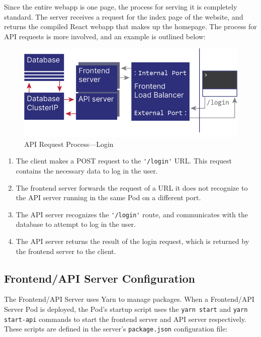 \documentclass[12pt]{article}
\begin{document}
Since the entire webapp is one page, the process for serving it is
completely standard.  The server receives a request for the index page
of the website, and returns the compiled React webapp that makes up
the homepage.  The process for API requests is more involved, and an
example is outlined below:

\begin{figure}[h!]

  \includegraphics[scale=1]{login_request}
  \centering
  \caption{API Request Process---Login}
  \label{rr:detailed}
\end{figure}

\begin{enumerate}
\item The client makes a POST request to the \lstinline{'/login'} URL.
  This request contains the necessary data to log in the user.
\item The frontend server forwards the request of a URL it does not
  recognize to the API server running in the same Pod on a different
  port.
\item The API server recognizes the \lstinline{'/login'} route, and
  communicates with the database to attempt to log in the user.
\item The API server returns the result of the login request, which is
  returned by the frontend server to the client.
\end{enumerate}

\subsection{Frontend/API Server Configuration}

The Frontend/API Server uses Yarn \cite{yarn} to manage packages.
When a Frontend/API Server Pod is deployed, the Pod's startup script
uses the \lstinline{yarn start} and \lstinline{yarn start-api}
commands to start the frontend server and API server respectively.
These scripts are defined in the server's \lstinline{package.json}
configuration file:
\end{document}
